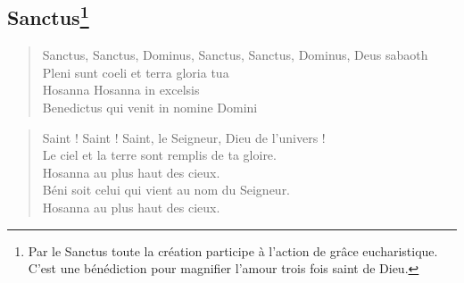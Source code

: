 \subsection*{Sanctus\footnote{Par le Sanctus toute la création participe à l'action de grâce            
eucharistique. C'est une bénédiction pour magnifier l'amour trois fois
saint de Dieu.}}

\begin{verse}
Sanctus, Sanctus, Dominus, Sanctus, Sanctus, Dominus, Deus sabaoth \\
Pleni sunt coeli et terra gloria tua \\
Hosanna Hosanna in excelsis \\
Benedictus qui venit in nomine Domini \\
\end{verse}

\begin{verse}
Saint ! Saint ! Saint, le Seigneur, Dieu de l'univers !\\
Le ciel et la terre sont remplis de ta gloire.\\
Hosanna au plus haut des cieux.\\
Béni soit celui qui vient au nom du Seigneur.\\
Hosanna au plus haut des cieux.
\end{verse}
